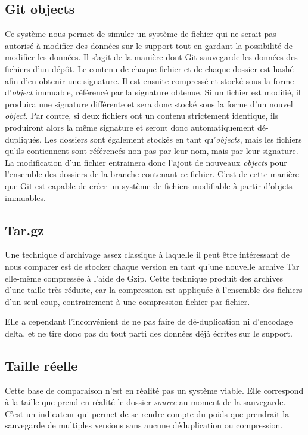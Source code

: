 \documentclass[a4paper]{report}
\begin{document}
\subsection{Git objects}

Ce système nous permet de simuler un système de fichier qui ne serait
pas autorisé à modifier des données sur le support tout en gardant la
possibilité de modifier les données. Il s'agit de la manière dont Git
sauvegarde les données des fichiers d'un dépôt. Le contenu de chaque
fichier et de chaque dossier est hashé afin d'en obtenir une signature.
Il est ensuite compressé et stocké sous la forme d'\emph{object}
immuable, référencé par la signature obtenue. Si un fichier est modifié,
il produira une signature différente et sera donc stocké sous la forme
d'un nouvel \emph{object}. Par contre, si deux fichiers ont un contenu
strictement identique, ils produiront alors la même signature et seront
donc automatiquement dé-dupliqués. Les dossiers sont également stockés
en tant qu'\emph{objects}, mais les fichiers qu'ils contiennent sont
référencés non pas par leur nom, mais par leur signature. La
modification d'un fichier entrainera donc l'ajout de nouveaux
\emph{objects} pour l'ensemble des dossiers de la branche contenant ce
fichier. C'est de cette manière que Git est capable de créer un système
de fichiers modifiable à partir d'objets immuables.

\subsection{Tar.gz}

Une technique d'archivage assez classique à laquelle il peut être
intéressant de nous comparer est de stocker chaque version en tant
qu'une nouvelle archive Tar elle-même compressée à l'aide de Gzip. Cette
technique produit des archives d'une taille très réduite, car la
compression est appliquée à l'ensemble des fichiers d'un seul coup,
contrairement à une compression fichier par fichier.

Elle a cependant l'inconvénient de ne pas faire de dé-duplication ni
d'encodage delta, et ne tire donc pas du tout parti des données déjà
écrites sur le support.

\subsection{Taille réelle}

Cette base de comparaison n'est en réalité pas un système viable. Elle
correspond à la taille que prend en réalité le dossier \emph{source} au
moment de la sauvegarde. C'est un indicateur qui permet de se rendre
compte du poids que prendrait la sauvegarde de multiples versions sans
aucune déduplication ou compression.
\end{document}
